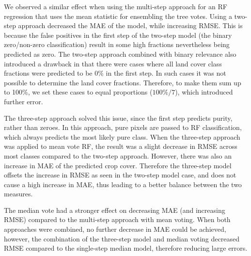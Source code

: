 \documentclass[review,authoryear,3p]{elsarticle}
\begin{document}
We observed a similar effect when using the multi-step approach for an \gls{RF} regression that uses the mean statistic for ensembling the tree votes.
Using a two-step approach decreased the \gls{MAE} of the model, while increasing \gls{RMSE}.
This is because the false positives in the first step of the two-step model (the binary zero/non-zero classification) result in some high fractions nevertheless being predicted as zero.
The two-step approach combined with binary relevance also introduced a drawback in that there were cases where all land cover class fractions were predicted to be 0\% in the first step.
In such cases it was not possible to determine the land cover fractions.
Therefore, to make them sum up to 100\%, we set these cases to equal proportions ($100\% / 7$), which introduced further error.

The three-step approach solved this issue, since the first step predicts purity, rather than zeroes.
In this approach, pure pixels are passed to \gls{RF} classification, which always predicts the most likely pure class.
When the three-step approach was applied to mean vote \gls{RF}, the result was a slight decrease in \gls{RMSE} across most classes compared to the two-step approach.
However, there was also an increase in \gls{MAE} of the predicted crop cover.
Therefore the three-step model offsets the increase in \gls{RMSE} as seen in the two-step model case, and does not cause a high increase in \gls{MAE}, thus leading to a better balance between the two measures.

The median vote had a stronger effect on decreasing \gls{MAE} (and increasing \gls{RMSE}) compared to the multi-step approach with mean voting.
When both approaches were combined, no further decrease in \gls{MAE} could be achieved, however, the combination of the three-step model and median voting decreased \gls{RMSE} compared to the single-step median model, therefore reducing large errors.
\end{document}
